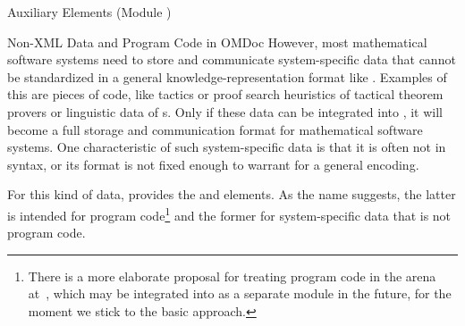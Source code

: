 \begin{tchapter}[id=ext,short=Auxiliary Elements]{Auxiliary Elements (Module {})}
\begin{tsection}[id=private]{Non-XML Data and Program Code in OMDoc}
  However, most mathematical software systems need to store and communicate
  system-specific data that cannot be standardized in a general knowledge-representation
  format like {\omdoc}. Examples of this are pieces of {} code, like
  tactics or proof search heuristics of tactical theorem provers or linguistic data of
  {s}.  Only if these data can be integrated into
  {\omdoc}, it will become a full storage and communication format for mathematical
  software systems. One characteristic of such system-specific data is that it is often
  not in {\xml} syntax, or its format is not fixed enough to warrant for a general {\xml}
  encoding.
  
  For this kind of data, {\omdoc} provides the {} and {}
  elements. As the name suggests, the latter is intended for program code\footnote{There
    is a more elaborate proposal for treating program code in the {\omdoc} arena
    at~\cite{Kohlhase:codemlspec}, which may be integrated into {\omdoc} as a separate
    module in the future, for the moment we stick to the basic approach.} and the former
  for system-specific data that is not program code.
  

\end{tsection}
\end{tchapter}
